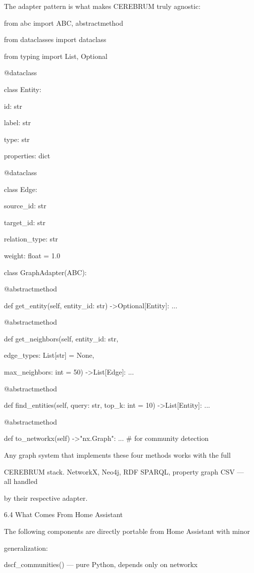 \documentclass[10pt,journal,compsoc]{IEEEtran}
\begin{document}
The adapter pattern is what makes CEREBRUM truly agnostic:

from abc import ABC, abstr\-actmethod

from dataclasses import dataclass

from typing import List, Optional

@dataclass

class Entity:

    id: str

    label: str

    type: str

    properties: dict

@dataclass

class Edge:

    source\_id: str

    target\_id: str

    relation\_type: str

    weight: float = 1.0

class GraphAdapter(ABC):

    @abstr\-actmethod

    def get\_entity(self, entity\_id: str) -\textgreater  Optional[Entity]: ...

    @abstr\-actmethod

    def get\_neighbors(self, entity\_id: str,

                      edge\_types: List[str] = None,

                      max\_neighbors: int = 50) -\textgreater  List[Edge]: ...

    @abstr\-actmethod

    def find\_entities(self, query: str, top\_k: int = 10) -\textgreater  List[Entity]: ...

    @abstr\-actmethod

    def to\_networkx(self) -\textgreater  "nx.Graph": ...  \# for community detection

Any graph system that implements these four methods works with the full

CEREBRUM stack. NetworkX, Neo4j, RDF SPARQL, property graph CSV — all handled

by their respective adapter.

6.4 What Comes From Home Assistant

The following components are directly portable from Home Assistant with minor

gener\-alization:

dscf\_communities() — pure Python, depends only on networkx
\end{document}
